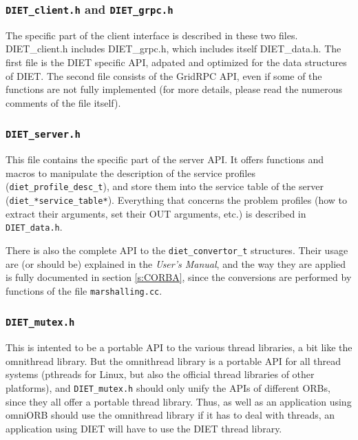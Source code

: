   \subsubsection{{\tt DIET\_client.h} and {\tt DIET\_grpc.h}}

  The specific part of the client interface is described in these two files.
  \textsf{DIET\_client.h} includes \textsf{DIET\_grpc.h}, which includes itself
  \textsf{DIET\_data.h}.
  The first file is the DIET specific API, adpated and optimized for the data
  structures of DIET. The second file consists of the GridRPC API, even if some of
  the functions are not fully implemented (for more details, please read the
      numerous comments of the file itself).


  \subsubsection{\tt DIET\_server.h}

  This file contains the specific part of the server API.
  It offers functions and macros to manipulate the description of the service
  profiles (\verb+diet_profile_desc_t+), and store them into the service table of
  the server (\verb+diet_*service_table*+). Everything that concerns the problem
  profiles (how to extract their arguments, set their OUT arguments, etc.) is
  described in \texttt{DIET\_data.h}.


  There is also the complete API to the \texttt{diet\_convertor\_t} structures.
  Their usage are (or should be) explained in the \textit{User's Manual}, and the
  way they are applied is fully documented in section \ref{s:CORBA}, since the
  conversions are performed by functions of the file \texttt{marshalling.cc}.

  \subsubsection{\tt DIET\_mutex.h} 

  This is intented to be a portable API to the various thread libraries, a bit
  like the \textsf{omnithread} library. But the \textsf{omnithread} library is a
  portable API for all thread systems (pthreads for Linux, but also the official
      thread libraries of other platforms), and {\tt DIET\_mutex.h} should only unify
  the APIs of different ORBs, since they all offer a portable thread library.
  Thus, as well as an application using \textsf{omniORB} should use the
  \textsf{omnithread} library if it has to deal with threads, an application using
  DIET will have to use the DIET thread library.

